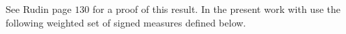 \documentclass[11pt,a4paper]{article}
\newcommand{\RR}{\mathbb{R}}
\newcommand{\NN}{\mathbb{N}}
\newcommand{\MC}{\mathcal{M}}
\newcommand{\XF}{\mathfrak{X}}
\newcommand{\Seq}[1]{\left(#1\right)_{n\in \mathbb{N}}}
\newcommand{\brac}[1]{\left\langle#1\right\rangle}
\newcommand{\dd}{\mathop{}\!\mathrm{d}}
\newtheorem{proposition}[theorem]{Proposition}
\begin{document}
See Rudin \cite{rudin1987real} page $130$ for a proof of this result. In the present work with use the following weighted set of signed measures defined below.
\end{document}
